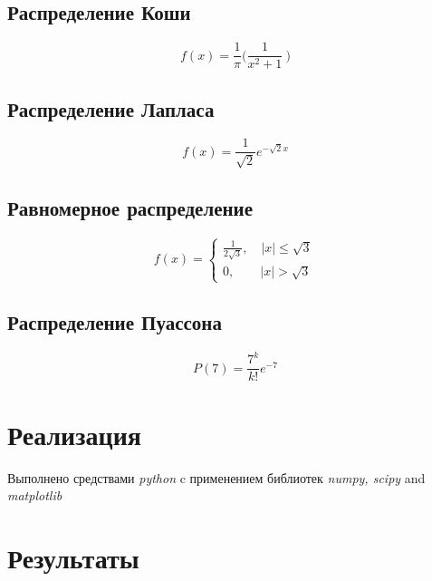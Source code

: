 \documentclass[12pt]{report}
\begin{document}
\subsection{Распределение Коши}

\begin{equation}
f(x)= \frac{1}{\pi}\bigg( \frac{1}{x^2 + 1}\ \bigg)
\end{equation}

\subsection{Распределение Лапласа}

\begin{equation} 
f(x)= \frac{1}{\sqrt{2}}e^{-\sqrt{2}x}
\end{equation}

\subsection{Равномерное распределение}

\begin{equation}
      f(x) = 
      \begin{cases}
      \frac{1}{2\sqrt{3}}, \quad |x| \leq \sqrt{3} \\
      0, \qquad |x| > \sqrt{3}
      \end{cases}
\end{equation}

\subsection{Распределение Пуассона}

\begin{equation}
P(7) = \frac{7^k}{k!}e^{-7}
\end{equation}

\pagebreak

\section{Реализация}
Выполнено средствами \textit{python} c применением библиотек \textit{numpy, scipy} and \textit{matplotlib}

\section{Результаты}
\end{document}
